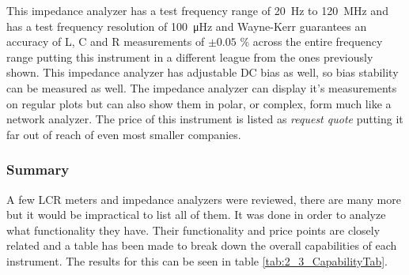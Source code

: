 This impedance analyzer has a test frequency range of \SI[]{20}{\hertz} to \SI[]{120}{\mega\hertz} and has a test frequency resolution of \SI[]{100}{\micro\hertz} and Wayne-Kerr guarantees an accuracy of L, C and R measurements of $\pm 0.05$ \% across the entire frequency range putting this instrument in a different league from the ones previously shown. This impedance analyzer has adjustable DC bias as well, so bias stability can be measured as well. The impedance analyzer can display it's measurements on regular plots but can also show them in polar, or complex, form much like a network analyzer. The price of this instrument is listed as \textit{request quote} putting it far out of reach of even most smaller companies.

\subsubsection*{Summary}
A few LCR meters and impedance analyzers were reviewed, there are many more but it would be impractical to list all of them. It was done in order to analyze what functionality they have. Their functionality and price points are closely related and a table has been made to break down the overall capabilities of each instrument. The results for this can be seen in table \ref{tab:2_3_CapabilityTab}.

